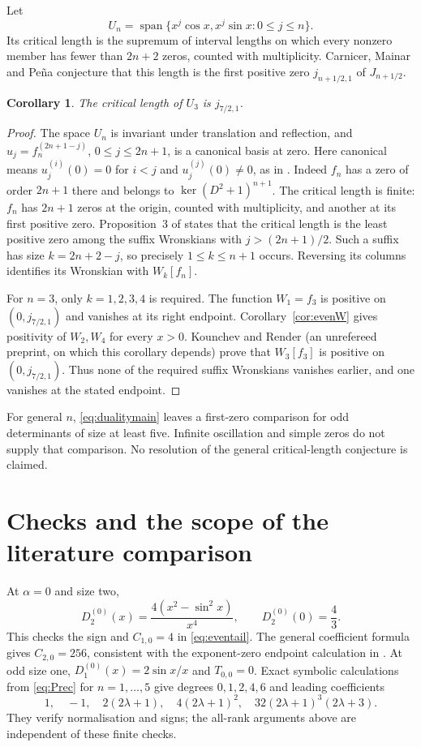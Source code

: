 \documentclass[11pt]{article}
\numberwithin{equation}{section}
\newtheorem{corollary}[theorem]{Corollary}
\theoremstyle{remark}
\DeclareMathOperator{\spanop}{span}
\begin{document}
Let
\[
 U_n=\spanop\{x^j\cos x,x^j\sin x:0\le j\le n\}.
\]
Its critical length is the supremum of interval lengths on which every
nonzero member has fewer than $2n+2$ zeros, counted with multiplicity.
Carnicer, Mainar and Pe\~na \cite{CMP2023} conjecture that this length
is the first positive zero $j_{n+1/2,1}$ of $J_{n+1/2}$.

\begin{corollary}\label{cor:CMP3}
The critical length of $U_3$ is $j_{7/2,1}$.
\end{corollary}

\begin{proof}
The space $U_n$ is invariant under translation and reflection, and
$u_j=f_n^{(2n+1-j)}$, $0\le j\le2n+1$, is a canonical basis at zero.
Here canonical means $u_j^{(i)}(0)=0$ for $i<j$ and
$u_j^{(j)}(0)\ne0$, as in \cite[Eq.~(2)]{CMP2023}.
Indeed $f_n$ has a zero of order $2n+1$ there and belongs to
$\ker(D^2+1)^{n+1}$. The critical length is finite: $f_n$ has
$2n+1$ zeros at the origin, counted with multiplicity, and another at
its first positive zero. Proposition~3 of \cite{CMP2023} states that the
critical length is the least positive zero among the suffix
Wronskians with $j>(2n+1)/2$. Such a suffix has size
$k=2n+2-j$, so precisely $1\le k\le n+1$ occurs. Reversing its
columns identifies its Wronskian with $W_k[f_n]$.

For $n=3$, only $k=1,2,3,4$ is required. The function $W_1=f_3$ is
positive on $(0,j_{7/2,1})$ and vanishes at its right endpoint.
Corollary~\ref{cor:evenW} gives positivity of $W_2,W_4$ for every
$x>0$. Kounchev and Render \cite[Corollary~21]{KounchevRender2025}
(an unrefereed preprint, on which this corollary depends) prove that $W_3[f_3]$ is positive on $(0,j_{7/2,1})$. Thus none of
the required suffix Wronskians vanishes earlier, and one vanishes at
the stated endpoint.
\end{proof}

For general $n$, \eqref{eq:dualitymain} leaves a first-zero comparison
for odd determinants of size at least five. Infinite oscillation and
simple zeros do not supply that comparison. No resolution of the
general critical-length conjecture is claimed.

\section{Checks and the scope of the literature comparison}\label{sec:scope}

At $\alpha=0$ and size two,
\[
 D_2^{(0)}(x)=\frac{4(x^2-\sin^2x)}{x^4},\qquad D_2^{(0)}(0)=\frac43.
\]
This checks the sign and $C_{1,0}=4$ in \eqref{eq:eventail}. The general
coefficient formula gives $C_{2,0}=256$, consistent with the exponent-zero endpoint
calculation in \cite{Celsus2022}. At odd size one,
$D_1^{(0)}(x)=2\sin x/x$ and $T_{0,0}=0$.
Exact symbolic calculations from \eqref{eq:Prec} for $n=1,\ldots,5$
give degrees $0,1,2,4,6$ and leading coefficients
\[
 1,\quad -1,\quad 2(2\lambda+1),\quad4(2\lambda+1)^2,
 \quad32(2\lambda+1)^3(2\lambda+3).
\]
They verify normalisation and signs; the all-rank arguments above are
independent of these finite checks.
\end{document}
